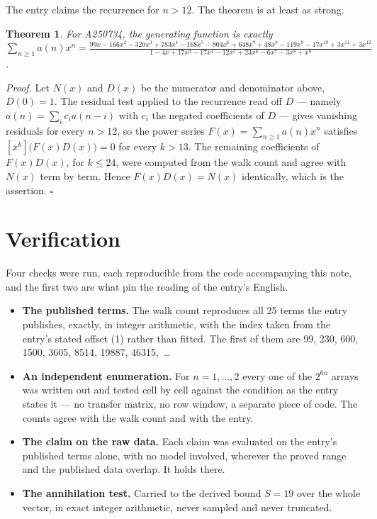 \documentclass[11pt]{article}
\newtheorem{theorem}{Theorem}
\theoremstyle{definition}
\begin{document}
The entry claims the recurrence for $n > 12$. The theorem is at least as strong.

\begin{theorem} For A250734, the generating function is exactly $\sum_{n\ge 1} a(n)x^n = \frac{99x - 166x^{2} - 320x^{3} + 783x^{4} - 168x^{5} - 804x^{6} + 648x^{7} + 48x^{8} - 119x^{9} - 17x^{10} + 3x^{11} + 3x^{12}}{1 - 4x + 17x^{3} - 17x^{4} - 12x^{5} + 23x^{6} - 6x^{7} - 3x^{8} + x^{9}}$.\end{theorem}

{\itshape Proof.} Let $N(x)$ and $D(x)$ be the numerator and denominator above, $D(0)=1$. The residual test applied to the recurrence read off $D$ --- namely $a(n) = \sum_i c_i a(n-i)$ with $c_i$ the negated coefficients of $D$ --- gives vanishing residuals for every $n > 12$, so the power series $F(x)=\sum_{n\ge 1}a(n)x^n$ satisfies $[x^k]\bigl(F(x)D(x)\bigr) = 0$ for every $k > 13$. The remaining coefficients of $F(x)D(x)$, for $k \le 24$, were computed from the walk count and agree with $N(x)$ term by term. Hence $F(x)D(x) = N(x)$ identically, which is the assertion. $\square$

\section{Verification}

Four checks were run, each reproducible from the code accompanying this note, and the first two are what pin the reading of the entry's English.

\begin{itemize}

\item {\bfseries The published terms.} The walk count reproduces all 25 terms the entry publishes, exactly, in integer arithmetic, with the index taken from the entry's stated offset (1) rather than fitted. The first of them are 99, 230, 600, 1500, 3605, 8514, 19887, 46315,~\dots

\item {\bfseries An independent enumeration.} For $n = 1,\dots,2$ every one of the $2^{6n}$ arrays was written out and tested cell by cell against the condition as the entry states it --- no transfer matrix, no row window, a separate piece of code. The counts agree with the walk count and with the entry.

\item {\bfseries The claim on the raw data.} Each claim was evaluated on the entry's published terms alone, with no model involved, wherever the proved range and the published data overlap. It holds there.

\item {\bfseries The annihilation test.} Carried to the derived bound $S = 19$ over the whole vector, in exact integer arithmetic, never sampled and never truncated.

\end{itemize}
\end{document}
